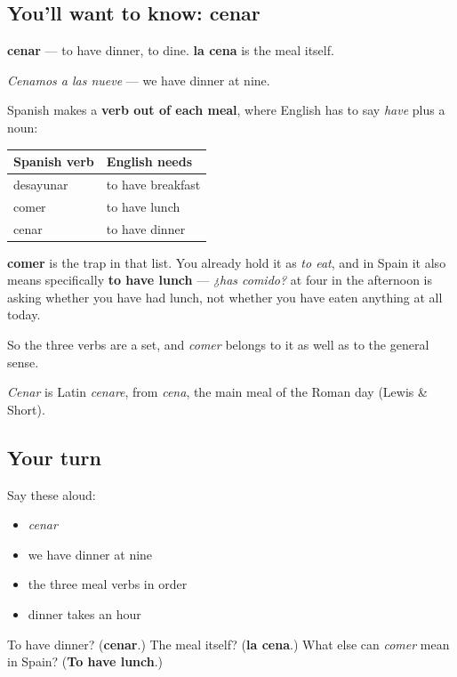 \subsection*{You'll want to know: cenar}
\textbf{cenar} — to have dinner, to dine. \textbf{la cena} is the meal itself.

\emph{Cenamos a las nueve} — we have dinner at nine.

\begin{cousinweb}
Spanish makes a \textbf{verb out of each meal}, where English has to say \emph{have} plus a noun:

\noindent
\begin{tabularx}{\linewidth}{@{}>{\raggedright\arraybackslash}X>{\raggedright\arraybackslash}X@{}}
\toprule
\textbf{Spanish verb} & \textbf{English needs} \\
\midrule
desayunar & to have breakfast \\
comer & to have lunch \\
cenar & to have dinner \\
\bottomrule
\end{tabularx}

\textbf{comer} is the trap in that list. You already hold it as \emph{to eat}, and in Spain it also means specifically \textbf{to have lunch} — \emph{¿has comido?} at four in the afternoon is asking whether you have had lunch, not whether you have eaten anything at all today.

So the three verbs are a set, and \emph{comer} belongs to it as well as to the general sense.

\emph{Cenar} is Latin \emph{cenare}, from \emph{cena}, the main meal of the Roman day (Lewis \& Short).
\end{cousinweb}

\subsection*{Your turn}
Say these aloud:

\begin{itemize}
\raggedright
  \item \emph{cenar}
  \item we have dinner at nine
  \item the three meal verbs in order
  \item dinner takes an hour
\end{itemize}

\begin{tcolorbox}[breakable,colback=teal!4,colframe=teal!35!black,title={Before you move on}]
To have dinner? (\textbf{cenar}.) The meal itself? (\textbf{la cena}.) What else can \emph{comer} mean in Spain? (\textbf{To have lunch}.)
\end{tcolorbox}
